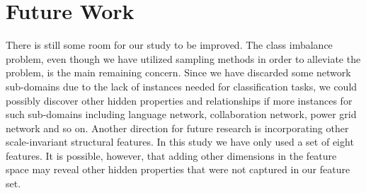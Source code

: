 \documentclass{article}
\begin{document}
 
\newpage

\section{Future Work}
There is still some room for our study to be improved. The class imbalance problem, even though we have utilized sampling methods in order to alleviate the problem, is the main remaining concern. Since we have discarded some network sub-domains due to the lack of instances needed for classification tasks, we could possibly discover other hidden properties and relationships if more instances for such sub-domains including language network, collaboration network, power grid network and so on. Another direction for future research is incorporating other scale-invariant structural features. In this study we have only used a set of eight features. It is possible, however, that adding other dimensions in the feature space may reveal other hidden properties that were not captured in our feature set.

\clearpage


 
\end{document}
